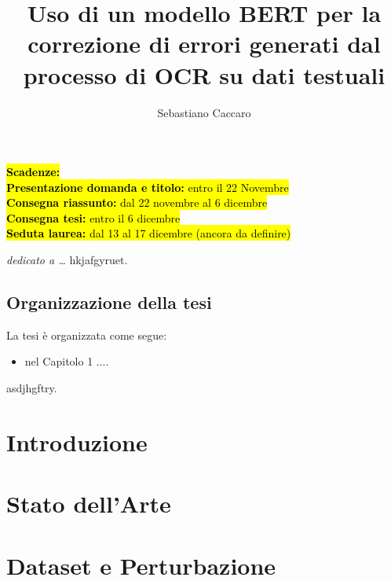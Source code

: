 \documentclass[a4paper,12pt,twoside,openright]{report}
\begin{document}
\newcommand{\E}{È}
\noindent
\hl{\textbf{Scadenze:}\\
\textbf{Presentazione domanda e titolo:} entro il 22 Novembre\\
\textbf{Consegna riassunto:} dal 22 novembre al 6 dicembre\\
\textbf{Consegna tesi:} entro il 6 dicembre\\
\textbf{Seduta laurea:} dal 13 al 17 dicembre (ancora da definire)
}
\title{Uso di un modello BERT per la correzione di errori generati dal processo di OCR su dati testuali}
\author{Sebastiano Caccaro}
%
% 
%
\beforepreface
\prefacesection{}
        {\hfill \Large {\sl dedicato a \dots}}
% 
%
hkjafgyruet.
%
%
\section*{Organizzazione della tesi}
\label{organizzazione}
La tesi \`e organizzata come segue:
\begin{itemize}
\item nel Capitolo 1 ....
\end{itemize}
%
%
asdjhgftry.
\afterpreface
% 
% 
\chapter{Introduzione}
\label{sec:intro}

\chapter{Stato dell'Arte}
\label{sec:arte}


\chapter{Dataset e Perturbazione}
\label{sec:dataset}

\end{document}
